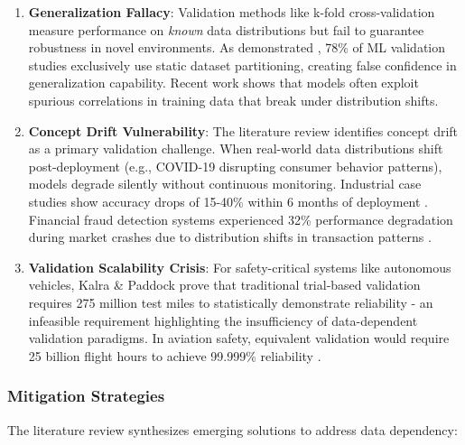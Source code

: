\documentclass[manuscript,screen,review]{acmart}
\begin{document}
\begin{enumerate}
    \item \textbf{Generalization Fallacy}: Validation methods like k-fold cross-validation measure performance on \textit{known} data distributions but fail to guarantee robustness in novel environments. As demonstrated , 78\% of ML validation studies exclusively use static dataset partitioning, creating false confidence in generalization capability. Recent work shows that models often exploit spurious correlations in training data that break under distribution shifts.
    
    \item \textbf{Concept Drift Vulnerability}: The literature review identifies concept drift as a primary validation challenge. When real-world data distributions shift post-deployment (e.g., COVID-19 disrupting consumer behavior patterns), models degrade silently without continuous monitoring. Industrial case studies show accuracy drops of 15-40\% within 6 months of deployment . Financial fraud detection systems experienced 32\% performance degradation during market crashes due to distribution shifts in transaction patterns .
    
    \item \textbf{Validation Scalability Crisis}: For safety-critical systems like autonomous vehicles, Kalra \& Paddock  prove that traditional trial-based validation requires 275 million test miles to statistically demonstrate reliability - an infeasible requirement highlighting the insufficiency of data-dependent validation paradigms. In aviation safety, equivalent validation would require 25 billion flight hours to achieve 99.999\% reliability .
\end{enumerate}

\subsubsection{Mitigation Strategies}
The literature review synthesizes emerging solutions to address data dependency:
\end{document}
